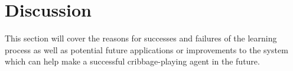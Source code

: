 \section{Discussion}
\label{sec:disc}



This section will cover the reasons for successes and failures of the learning
process as well as potential future applications or improvements to the
system which can help make a successful cribbage-playing agent in the future.









